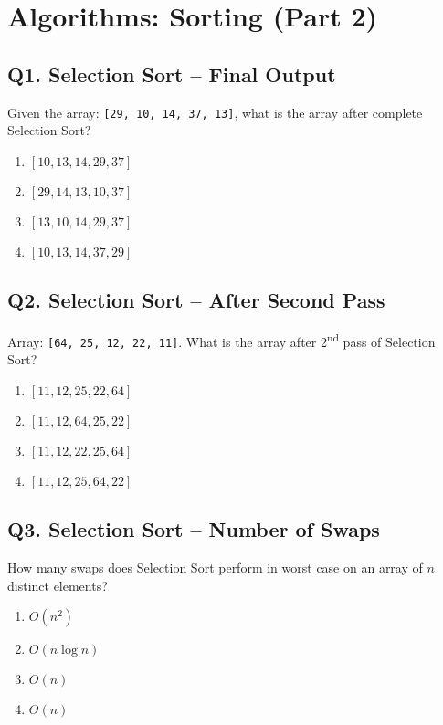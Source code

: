 \section{Algorithms: Sorting (Part 2)}

\subsection*{Q1. Selection Sort – Final Output}
Given the array: \texttt{[29, 10, 14, 37, 13]}, what is the array after complete Selection Sort?

\begin{enumerate}[label=(\alph*)]
    \item $[10, 13, 14, 29, 37]$ 
    \item $[29, 14, 13, 10, 37]$ 
    \item $[13, 10, 14, 29, 37]$ 
    \item $[10, 13, 14, 37, 29]$
\end{enumerate}


\subsection*{Q2. Selection Sort – After Second Pass}
Array: \texttt{[64, 25, 12, 22, 11]}. What is the array after 2\textsuperscript{nd} pass of Selection Sort?

\begin{enumerate}[label=(\alph*)]
    \item $[11, 12, 25, 22, 64]$ 
    \item $[11, 12, 64, 25, 22]$ 
    \item $[11, 12, 22, 25, 64]$ 
    \item $[11, 12, 25, 64, 22]$
\end{enumerate}


\subsection*{Q3. Selection Sort – Number of Swaps}
How many swaps does Selection Sort perform in worst case on an array of \(n\) distinct elements?

\begin{enumerate}[label=(\alph*)]
    \item \(O(n^2)\) 
    \item \(O(n\log n)\) 
    \item \(O(n)\) 
    \item \(\Theta(n)\)
\end{enumerate}

